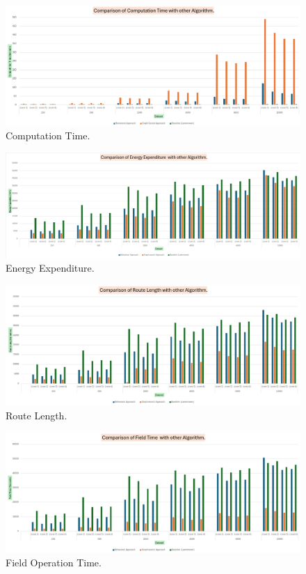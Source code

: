 \begin{figure}[H]
    \centering
    \includegraphics[width=\textwidth]{Images/plots/all/Computation_time.png}
    \caption{Computation Time.}
    \label{fig:Computation_time_all}
\end{figure}

\begin{figure}[H]
    \centering
    \includegraphics[width=\textwidth]{Images/plots/all/Energy.png}
    \caption{Energy Expenditure.}
    \label{fig:Energy_expenditure_all}
\end{figure}

\begin{figure}[H]
    \centering
    \includegraphics[width=\textwidth]{Images/plots/all/route_length.png}
    \caption{Route Length.}
    \label{fig:Route_length_all}
\end{figure}

\begin{figure}[H]
    \centering
    \includegraphics[width=\textwidth]{Images/plots/all/Field_time.png}
    \caption{Field Operation Time.}
    \label{fig:Field_operation_time_all}
\end{figure}


